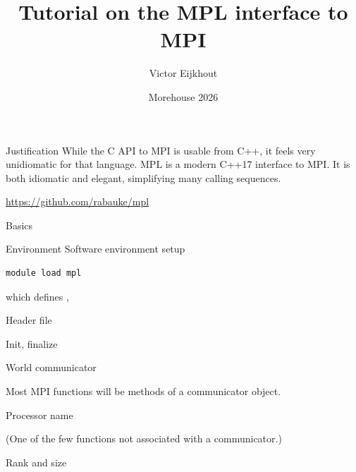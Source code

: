 \documentclass[10pt]{beamer}
\begin{document}
\title[MPL]{Tutorial on the MPL interface to MPI}
\author[Eijkhout]{Victor Eijkhout}
\date[2026]{Morehouse 2026}

\maketitle

\begin{frame}{Justification}
  While the C API to MPI is usable from C++, it feels very unidiomatic
  for that language.
  \acf{MPL} is a modern C++17 interface to MPI.
  It is both idiomatic and elegant, simplifying many calling sequences.

  \url{https://github.com/rabauke/mpl}
\end{frame}

\begin{exercises}
  \makeatletter
  \makeatother
\end{exercises}

 {Basics}

\begin{numberedframe}{Environment}
  Software environment setup
\begin{verbatim}
module load mpl
\end{verbatim}
which defines , 
\end{numberedframe}

\begin{numberedframe}{Header file}
  
\end{numberedframe}
\begin{numberedframe}{Init, finalize}
  
\end{numberedframe}
\begin{numberedframe}{World communicator}
  

  Most MPI functions will be methods
  of a communicator object.
\end{numberedframe}

\begin{numberedframe}{Processor name}
  
  (One of the few functions not associated with a communicator.)
\end{numberedframe}

\begin{numberedframe}{Rank and size}
  
\end{numberedframe}
\end{document}
